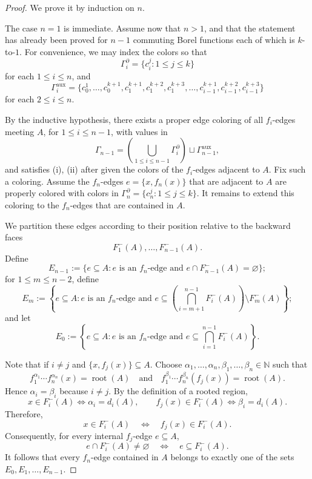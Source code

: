 \documentclass[11pt, reqno, a4paper]{amsart}
\theoremstyle{definition}
\theoremstyle{plain}
\begin{document}
\begin{proof}
We prove it by induction on $n$.

The case $n=1$ is immediate. Assume now that $n>1$, and that the statement has already been proved for $n-1$ commuting  Borel functions each of which is $k$-to-$1$. For convenience, we may index the colors so that
$$
\Gamma_i^\partial=\{c_i^j:1\le j\le k\}
$$
for each $1\leq i\leq n$, and
$$
\Gamma_i^{\mathrm{aux}}
=
\{c_0^1,\dots,c_0^{k+1},c_1^{k+1},c_1^{k+2},c_1^{k+3},\dots,c_{i-1}^{k+1},c_{i-1}^{k+2},c_{i-1}^{k+3}\}
$$
for each $2\le i\le n$.

By the inductive hypothesis, there exists a proper edge coloring of all $f_i$-edges meeting $A$, for $1\le i\le n-1$, with values in
$$
\Gamma_{n-1}
=
\left(\bigcup_{1\le i\le n-1}\Gamma_i^\partial\right)\sqcup \Gamma_{n-1}^{\mathrm{aux}},
$$
and satisfies \textup{(i)}, \textup{(ii)} after given the colors of the $f_i$-edges adjacent to $A$. Fix such a coloring. Assume the $f_n$-edges $e=\{x,f_n(x)\}$ that are adjacent to $A$ are properly colored with colors in $\Gamma_n^\partial=\{c_n^j:1\le j\le k\}$. It remains to extend this coloring to the $f_n$-edges that are  contained in $A$.

We partition these edges according to their position relative to the backward faces
$$
F_1^-(A),\dots,F_{n-1}^-(A).
$$
Define
$$
E_{n-1}:=\{e\subseteq A: e \text{ is an }f_n\text{-edge and } e\cap F_{n-1}^-(A)=\varnothing\};
$$
for $1\le m\le n-2$, define
$$
E_m:=\left\{e\subseteq A:
e \text{ is an }f_n\text{-edge and }
e\subseteq \left(\bigcap_{i=m+1}^{n-1}F_i^-(A)\right)\setminus F_m^-(A)
\right\};
$$
and let
$$
E_0:=\left\{e\subseteq A:
e \text{ is an }f_n\text{-edge and }
e\subseteq \bigcap_{i=1}^{n-1}F_i^-(A)
\right\}.
$$

Note that if $i\neq j$ and $\{x,f_j(x)\}\subseteq A$. Choose
$\alpha_1,\ldots,\alpha_n,\beta_1,\ldots,\beta_n\in\mathbb N$
such that
$$
f_1^{\alpha_1}\cdots f_n^{\alpha_n}(x)=\operatorname{root}(A)
\quad\text{and}\quad
f_1^{\beta_1}\cdots f_n^{\beta_n}(f_j(x))=\operatorname{root}(A).
$$
Hence
$\alpha_i=\beta_i$ because $i\neq j$. By the definition of a
rooted region,
$$
x\in F_i^-(A)\iff \alpha_i=d_i(A),
\qquad
f_j(x)\in F_i^-(A)\iff \beta_i=d_i(A).
$$
Therefore,
$$
x\in F_i^-(A)
\quad\Longleftrightarrow\quad
f_j(x)\in F_i^-(A).
$$
Consequently, for every internal $f_j$-edge $e\subseteq A$,
$$
e\cap F_i^-(A)\neq\varnothing
\quad\Longleftrightarrow\quad
e\subseteq F_i^-(A).
$$
It follows that every $f_n$-edge contained in $A$ belongs to
exactly one of the sets $E_0,E_1,\ldots,E_{n-1}$.



\end{proof}
\end{document}
